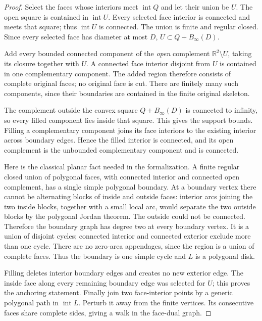 \begin{proof}
Select the faces whose interiors meet $\operatorname{int}Q$ and let their
union be $U$.  The open square is contained in $\operatorname{int}U$.
Every selected face interior is connected and meets that square; thus
$\operatorname{int}U$ is connected.  The union is finite and regular closed.
Since every selected face has diameter at most $D$,
$U\subset Q+B_\infty(D)$.

Add every bounded connected component of the \emph{open} complement
$\mathbb R^2\setminus U$, taking its closure together with $U$.  A connected
face interior disjoint from $U$ is contained in one complementary component.
The added region therefore consists of complete original faces; no original
face is cut.  There are finitely many such components, since their boundaries
are contained in the finite original skeleton.

The complement outside the convex square $Q+B_\infty(D)$ is connected to
infinity, so every filled component lies inside that square.  This gives the
support bounds.  Filling a complementary component joins its face interiors
to the existing interior across boundary edges.  Hence the filled interior
is connected, and its open complement is the unbounded complementary
component and is connected.

Here is the classical planar fact needed in the formalization.  A finite
regular closed union of polygonal faces, with connected interior and
connected open complement, has a single simple polygonal boundary.  At a
boundary vertex there cannot be alternating blocks of inside and outside
faces: interior arcs joining the two inside blocks, together with a small
local arc, would separate the two outside blocks by the polygonal Jordan
theorem.  The outside could not be connected.  Therefore the boundary graph
has degree two at every boundary vertex.  It is a union of disjoint cycles;
connected interior and connected exterior exclude more than one cycle.
There are no zero-area appendages, since the region is a union of complete
faces.  Thus the boundary is one simple cycle and $L$ is a polygonal disk.

Filling deletes interior boundary edges and creates no new exterior edge.
The inside face along every remaining boundary edge was selected for $U$;
this proves the anchoring statement.  Finally join two face-interior points
by a generic polygonal path in $\operatorname{int}L$.  Perturb it away from
the finite vertices.  Its consecutive faces share complete sides, giving
a walk in the face-dual graph.
\end{proof}

